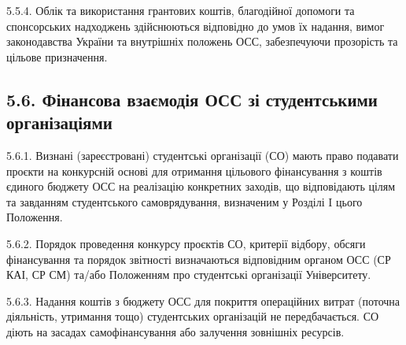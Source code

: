     5.5.4. Облік та використання грантових коштів, благодійної допомоги та спонсорських надходжень здійснюються відповідно до умов їх надання, вимог законодавства України та внутрішніх положень ОСС, забезпечуючи прозорість та цільове призначення.

\subsection*{5.6. Фінансова взаємодія ОСС зі студентськими організаціями}
    5.6.1. Визнані (зареєстровані) студентські організації (СО) мають право подавати проєкти на конкурсній основі для отримання цільового фінансування з коштів єдиного бюджету ОСС на реалізацію конкретних заходів, що відповідають цілям та завданням студентського самоврядування, визначеним у Розділі I цього Положення.

    5.6.2. Порядок проведення конкурсу проєктів СО, критерії відбору, обсяги фінансування та порядок звітності визначаються відповідним органом ОСС (СР КАІ, СР СМ) та/або Положенням про студентські організації Університету.

    5.6.3. Надання коштів з бюджету ОСС для покриття операційних витрат (поточна діяльність, утримання тощо) студентських організацій не передбачається. СО діють на засадах самофінансування або залучення зовнішніх ресурсів.
